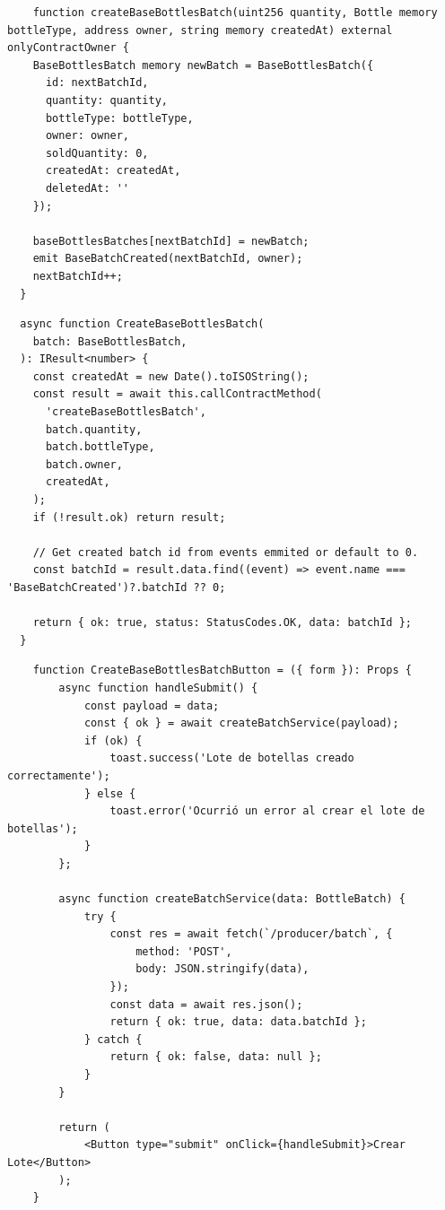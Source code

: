 
\begin{listing}[!tb]
\caption{Ejemplo de función para la creación de un lote de botellas de vidrio en la blockchain (Solidity)}
\label{listing:solidity-create-batch-code}
\begin{verbatim}
	function createBaseBottlesBatch(uint256 quantity, Bottle memory bottleType, address owner, string memory createdAt) external onlyContractOwner {
    BaseBottlesBatch memory newBatch = BaseBottlesBatch({
      id: nextBatchId,
      quantity: quantity,
      bottleType: bottleType,
      owner: owner,
      soldQuantity: 0,
      createdAt: createdAt,
      deletedAt: ''
    });

    baseBottlesBatches[nextBatchId] = newBatch;
    emit BaseBatchCreated(nextBatchId, owner);
    nextBatchId++;
  }
\end{verbatim}
\end{listing}

\begin{listing}[!tb]
\caption{Ejemplo de función del repositorio de la API para la creación de un lote de botellas de vidrio (Node.js)}
\label{listing:api-create-batch-code}
\begin{verbatim}
  async function CreateBaseBottlesBatch(
    batch: BaseBottlesBatch,
  ): IResult<number> {
    const createdAt = new Date().toISOString();
    const result = await this.callContractMethod(
      'createBaseBottlesBatch',
      batch.quantity,
      batch.bottleType,
      batch.owner,
      createdAt,
    );
    if (!result.ok) return result;

    // Get created batch id from events emmited or default to 0.
    const batchId = result.data.find((event) => event.name === 'BaseBatchCreated')?.batchId ?? 0;

    return { ok: true, status: StatusCodes.OK, data: batchId };
  }
\end{verbatim}
\end{listing}

\begin{listing}[!tb]
\caption{Ejemplo de función para la creación de un lote de botellas de vidrio en el frontend (Next.js)}
\label{listing:frontend-create-batch-code}
\begin{verbatim}
	function CreateBaseBottlesBatchButton = ({ form }): Props {
		async function handleSubmit() {
			const payload = data;
			const { ok } = await createBatchService(payload);
			if (ok) {
				toast.success('Lote de botellas creado correctamente');
			} else {
				toast.error('Ocurrió un error al crear el lote de botellas');
			}
		};

		async function createBatchService(data: BottleBatch) {
			try {
				const res = await fetch(`/producer/batch`, {
					method: 'POST',
					body: JSON.stringify(data),
				});
				const data = await res.json();
				return { ok: true, data: data.batchId };
			} catch {
				return { ok: false, data: null };
			}
		}

		return (
			<Button type="submit" onClick={handleSubmit}>Crear Lote</Button>
		);
	}
\end{verbatim}
\end{listing}

